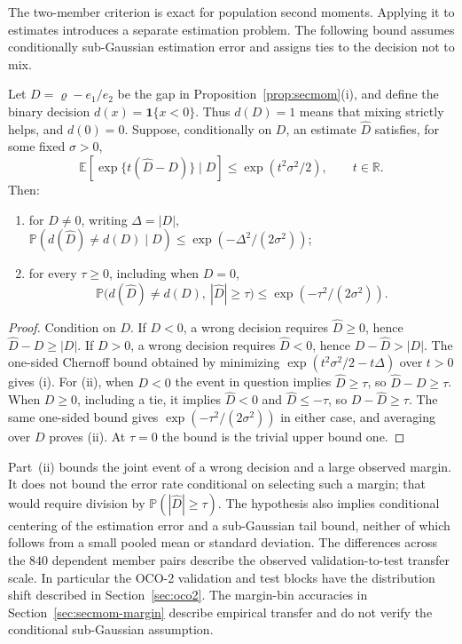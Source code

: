 The two-member criterion is exact for population second moments. Applying
it to estimates introduces a separate estimation problem. The following
bound assumes conditionally sub-Gaussian estimation error and assigns ties
to the decision not to mix.

\begin{proposition}\label{prop:margin}
Let $D=\varrho-e_1/e_2$ be the gap in
Proposition~\ref{prop:secmom}(i), and define the binary decision
$d(x)=\mathbf 1\{x<0\}$. Thus $d(D)=1$ means that mixing strictly helps,
and $d(0)=0$. Suppose, conditionally on $D$, an estimate $\widehat D$
satisfies, for some fixed $\sigma>0$,
\[
\mathbb E\!\left[\exp\{t(\widehat D-D)\}\mid D\right]
\le \exp(t^2\sigma^2/2),\qquad t\in\mathbb R.
\]
Then:
\begin{enumerate}
\item[(i)] for $D\ne0$, writing $\Delta=|D|$,
$\mathbb P(d(\widehat D)\ne d(D)\mid D)
\le \exp(-\Delta^2/(2\sigma^2))$;
\item[(ii)] for every $\tau\ge0$, including when $D=0$,
\[
\mathbb P\big(d(\widehat D)\ne d(D),\ |\widehat D|\ge\tau\big)
\le \exp(-\tau^2/(2\sigma^2)).
\]
\end{enumerate}
\end{proposition}

\begin{proof}\label{proof:prop:margin}
Condition on $D$. If $D<0$, a wrong decision requires $\widehat D\ge0$,
hence $\widehat D-D\ge|D|$. If $D>0$, a wrong decision requires
$\widehat D<0$, hence $D-\widehat D>|D|$. The one-sided Chernoff bound
obtained by minimizing $\exp(t^2\sigma^2/2-t\Delta)$ over $t>0$ gives (i).
For (ii), when $D<0$ the event in question implies $\widehat D\ge\tau$,
so $\widehat D-D\ge\tau$. When $D\ge0$, including a tie, it implies
$\widehat D<0$ and $\widehat D\le-\tau$, so $D-\widehat D\ge\tau$.
The same one-sided bound gives $\exp(-\tau^2/(2\sigma^2))$ in either
case, and averaging over $D$ proves (ii). At $\tau=0$ the bound is the
trivial upper bound one.
\end{proof}

Part~(ii) bounds the joint event of a wrong decision and a large observed
margin. It does not bound the error rate conditional on selecting such a
margin; that would require division by $\mathbb P(|\widehat D|\ge\tau)$.
The hypothesis also implies conditional centering of the estimation error
and a sub-Gaussian tail bound, neither of which follows from a small pooled
mean or standard deviation. The differences across the $840$ dependent
member pairs describe the observed validation-to-test transfer scale. In particular the OCO-2 validation and test
blocks have the distribution shift described in Section~\ref{sec:oco2}.
The margin-bin accuracies in Section~\ref{sec:secmom-margin} describe
empirical transfer and do not verify the conditional sub-Gaussian assumption.

